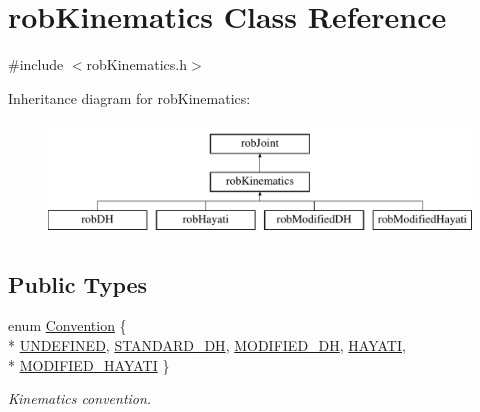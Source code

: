 \hypertarget{classrob_kinematics}{\section{rob\-Kinematics Class Reference}
\label{classrob_kinematics}
}


{\ttfamily \#include $<$rob\-Kinematics.\-h$>$}

Inheritance diagram for rob\-Kinematics\-:\begin{figure}[H]
\begin{center}
\leavevmode
\includegraphics[height=3.000000cm]{db/d3c/classrob_kinematics}
\end{center}
\end{figure}
\subsection*{Public Types}
\begin{DoxyCompactItemize}
\item 
enum \hyperlink{classrob_kinematics_a298703e920da583d1f6aa60c8f65ca78}{Convention} \{ \\*
\hyperlink{classrob_kinematics_a298703e920da583d1f6aa60c8f65ca78ac39fd63d5dfdc5944393f75571e92ddc}{U\-N\-D\-E\-F\-I\-N\-E\-D}, 
\hyperlink{classrob_kinematics_a298703e920da583d1f6aa60c8f65ca78ade9e8907f05b769643a03cab1090c630}{S\-T\-A\-N\-D\-A\-R\-D\-\_\-\-D\-H}, 
\hyperlink{classrob_kinematics_a298703e920da583d1f6aa60c8f65ca78a4b835a1beb57c12542c4d946dfc33f85}{M\-O\-D\-I\-F\-I\-E\-D\-\_\-\-D\-H}, 
\hyperlink{classrob_kinematics_a298703e920da583d1f6aa60c8f65ca78a0d17a6e253b23bdcc3f7867e43e2917a}{H\-A\-Y\-A\-T\-I}, 
\\*
\hyperlink{classrob_kinematics_a298703e920da583d1f6aa60c8f65ca78a983c7e2782aebd4085826955c16e1a2e}{M\-O\-D\-I\-F\-I\-E\-D\-\_\-\-H\-A\-Y\-A\-T\-I}
 \}
\begin{DoxyCompactList}\small\item\em Kinematics convention. \end{DoxyCompactList}\end{DoxyCompactItemize}
